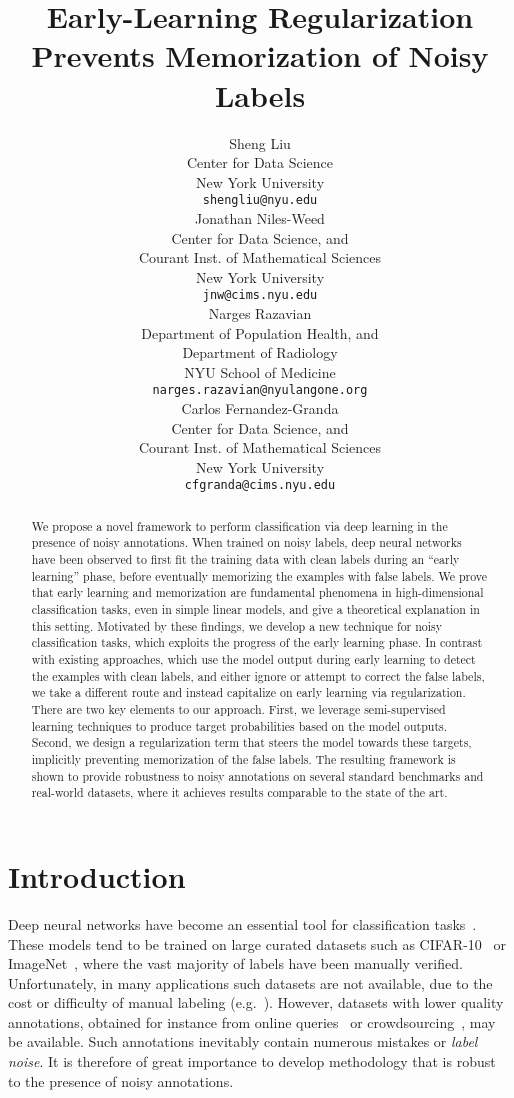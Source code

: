 \documentclass{article}
\title{Early-Learning Regularization Prevents Memorization of Noisy Labels}
\author{Sheng Liu \\
  Center for Data Science\\
  New York University\\
  \texttt{shengliu@nyu.edu} \\
  \And
  Jonathan Niles-Weed\\
   Center for Data Science, and\\
   Courant Inst. of Mathematical Sciences\\
   New York University\\
   \texttt{jnw@cims.nyu.edu} \\
  \And
  Narges Razavian\\
  Department of Population Health, and\\
  Department of Radiology\\
  NYU School of Medicine\\
   \texttt{narges.razavian@nyulangone.org} \\
  \And
  Carlos Fernandez-Granda\\
  Center for Data Science, and\\
   Courant Inst. of Mathematical Sciences\\
   New York University\\
   \texttt{cfgranda@cims.nyu.edu} \\
}
\newcommand{\1}{\mathds{1}}
\begin{document}
\maketitle

\begin{abstract}
  We propose a novel framework to perform classification via deep learning in the presence of noisy annotations. When trained on noisy labels, deep neural networks have been observed to first fit the training data with clean labels during an ``early learning'' phase, before eventually memorizing the examples with false labels. We prove that early learning and memorization are fundamental phenomena in high-dimensional classification tasks, even in simple linear models, and give a theoretical explanation in this setting. Motivated by these findings, we develop a new technique for noisy classification tasks, which exploits the progress of the early learning phase. In contrast with existing approaches, which use the model output during early learning to detect the examples with clean labels, and either ignore or attempt to correct the false labels, we take a different route and instead capitalize on early learning via regularization. There are two key elements to our approach. First, we leverage semi-supervised learning techniques to produce target probabilities based on the model outputs. Second, we design a regularization term that steers the model towards these targets, implicitly preventing memorization of the false labels. The resulting framework is shown to provide robustness to noisy annotations on several standard benchmarks and real-world datasets, where it achieves results comparable to the state of the art.
 \end{abstract}

\section{Introduction}

Deep neural networks have become an essential tool for classification tasks~\citep{krizhevsky2012imagenet,he2016deep,girshick2014rich}. These models tend to be trained on large curated datasets such as CIFAR-10~\citep{krizhevsky2009learning} or ImageNet~\citep{deng2009imagenet}, where the vast majority of labels have been manually verified. Unfortunately, in many applications such datasets are not available, due to the cost or difficulty of manual labeling (e.g.~\citep{guan2018said,pechenizkiy2006class,liu20a,ait2010high}). However, datasets with lower quality annotations, obtained for instance from online queries~\citep{blum2003noise} or crowdsourcing~\citep{yan2014learning,yu2018learning}, may be available. Such annotations inevitably contain numerous mistakes or \emph{label noise}. It is therefore of great importance to develop methodology that is robust to the presence of noisy annotations.
\end{document}
